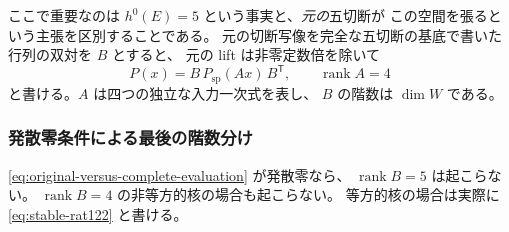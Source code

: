 ここで重要なのは $h^0(E)=5$ という事実と、\emph{元の}五切断が
この空間を張るという主張を区別することである。
元の切断写像を完全な五切断の基底で書いた行列の双対を $B$ とすると、
元の lift は非零定数倍を除いて
\begin{equation}
 P(x)=B\,P_{\mathrm{sp}}(Ax)\,B^{\mathsf T},
 \qquad \operatorname{rank}A=4
 \label{eq:original-versus-complete-evaluation}
\end{equation}
と書ける。$A$ は四つの独立な入力一次式を表し、
$B$ の階数は $\dim W$ である。

\subsubsection{発散零条件による最後の階数分け}

\begin{proposition}[二次モデルの発散零部分]
\label{prop:spinor-divergence-classification}
\eqref{eq:original-versus-complete-evaluation} が発散零なら、
$\operatorname{rank}B=5$ は起こらない。
$\operatorname{rank}B=4$ の非等方的核の場合も起こらない。
等方的核の場合は実際に \eqref{eq:stable-rat122} と書ける。
\end{proposition}

